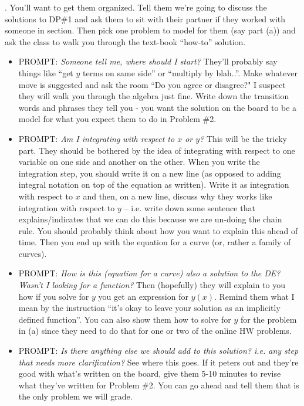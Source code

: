\documentclass[epsf]{article}
\begin{document}
.  You'll want to get them organized.  Tell them we're going to discuss the solutions to DP\#1 and ask them to sit with their partner if they worked with someone in section.   Then pick one problem to model for them (say part (a)) and ask the class to walk you through the text-book ``how-to'' solution.  
\begin{itemize}
\item PROMPT: \textit{Someone tell me, where should I start?} They'll probably say things like ``get $y$ terms on same side'' or ``multiply by blah..''.  Make whatever move is suggested and ask the room ``Do you agree or disagree?"  I suspect they will walk you through the algebra just fine.  Write down the transition words and phrases they tell you - you want the solution on the board to be a model for what you expect them to do in Problem \#2.

\item PROMPT: \textit{ Am I integrating with respect to $x$ or $y$?}  This will be the tricky part.  They should be bothered by the idea of integrating with respect to one variable on one side and another on the other.  When you write the integration step, you should write it on a new line (as opposed to adding integral notation on top of the equation as written).  Write it as integration with respect to $x$ and then, on a new line, discuss why they works like integration with respect to $y$ -- i.e. write down some sentence that explains/indicates that we can do this because we are un-doing the chain rule.  You should probably think about how you want to explain this ahead of time.  Then you end up with the equation for a curve (or, rather a family of curves).

\item PROMPT: \textit{How is this (equation for a curve) also a solution to the DE?  Wasn't I looking for a function?}  Then (hopefully) they will explain to you how if you solve for $y$ you get an expression for $y(x)$.  Remind them what I mean by the instruction ``it's okay to leave your solution as an implicitly defined function''.  You can also show them how to solve for $y$ for the problem in (a) since they need to do that for one or two of the online HW problems.

\item PROMPT: \textit{Is there anything else we should add to this solution? i.e. any step that needs more clarification?}  See where this goes.  If it peters out and they're good with what's written on the board, give them 5-10 minutes to revise what they've written for Problem \#2.  You can go ahead and tell them that is the only problem we will grade.  
\end{itemize}
\end{document}
